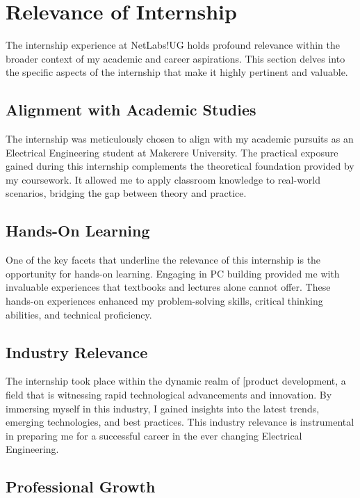 \section{Relevance of Internship}

The internship experience at NetLabs!UG holds profound relevance within the broader context of my academic and career aspirations. This section delves into the specific aspects of the internship that make it highly pertinent and valuable.

\subsection{Alignment with Academic Studies}

The internship was meticulously chosen to align with my academic pursuits as an Electrical Engineering student at Makerere University. The practical exposure gained during this internship complements the theoretical foundation provided by my coursework. It allowed me to apply classroom knowledge to real-world scenarios, bridging the gap between theory and practice.

\subsection{Hands-On Learning}

One of the key facets that underline the relevance of this internship is the opportunity for hands-on learning. Engaging in PC building provided me with invaluable experiences that textbooks and lectures alone cannot offer. These hands-on experiences enhanced my problem-solving skills, critical thinking abilities, and technical proficiency.

\subsection{Industry Relevance}

The internship took place within the dynamic realm of [product development, a field that is witnessing rapid technological advancements and innovation. By immersing myself in this industry, I gained insights into the latest trends, emerging technologies, and best practices. This industry relevance is instrumental in preparing me for a successful career in the ever changing Electrical Engineering.

\subsection{Professional Growth}

